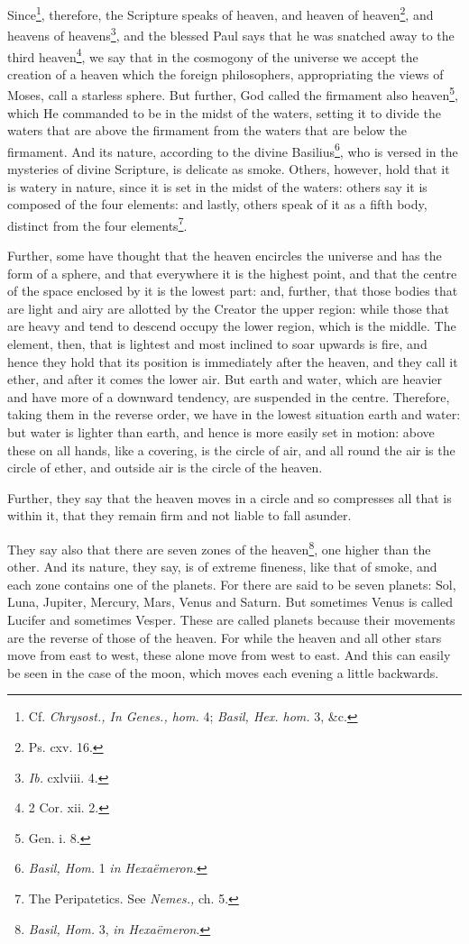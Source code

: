 Since\footnote{Cf. \emph{Chrysost., In Genes., hom. }4; \emph{Basil, Hex. hom. }3, \&c.}, therefore, the Scripture speaks of heaven, and heaven of heaven\footnote{Ps. cxv. 16.}, and heavens of heavens\footnote{\emph{Ib.} cxlviii. 4.}, and the blessed Paul says that he was snatched away to the third heaven\footnote{2 Cor. xii. 2.}, we say that in the cosmogony of the universe we accept the creation of a heaven which the foreign philosophers, appropriating the views of Moses, call a starless sphere. But further, God called the firmament also heaven\footnote{Gen. i. 8.}, which He commanded to be in the midst of the waters, setting it to divide the waters that are above the firmament from the waters that are below the firmament. And its nature, according to the divine Basilius\footnote{\emph{Basil, Hom. }1 \emph{in Hexaëmeron.}}, who is versed in the mysteries of divine Scripture, is delicate as smoke. Others, however, hold that it is watery in nature, since it is set in the midst of the waters: others say it is composed of the four elements: and lastly, others speak of it as a fifth body, distinct from the four elements\footnote{The Peripatetics. See \emph{Nemes., }ch. 5.}.

Further, some have thought that the heaven encircles the universe and has the form of a sphere, and that everywhere it is the highest point, and that the centre of the space enclosed by it is the lowest part: and, further, that those bodies that are light and airy are allotted by the Creator the upper region: while those that are heavy and tend to descend occupy the lower region, which is the middle. The element, then, that is lightest and most inclined to soar upwards is fire, and hence they hold that its position is immediately after the heaven, and they call it ether, and after it comes the lower air. But earth and water, which are heavier and have more of a downward tendency, are suspended in the centre. Therefore, taking them in the reverse order, we have in the lowest situation earth and water: but water is lighter than earth, and hence is more easily set in motion: above these on all hands, like a covering, is the circle of air, and all round the air is the circle of ether, and outside air is the circle of the heaven.

Further, they say that the heaven moves in a circle and so compresses all that is within it, that they remain firm and not liable to fall asunder.

They say also that there are seven zones of the heaven\footnote{\emph{Basil, Hom.} 3, \emph{in Hexaëmeron}.}, one higher than the other. And its nature, they say, is of extreme fineness, like that of smoke, and each zone contains one of the planets. For there are said to be seven planets: Sol, Luna, Jupiter, Mercury, Mars, Venus and Saturn. But sometimes Venus is called Lucifer and sometimes Vesper. These are called planets because their movements are the reverse of those of the heaven. For while the heaven and all other stars move from east to west, these alone move from west to east. And this can easily be seen in the case of the moon, which moves each evening a little backwards.

